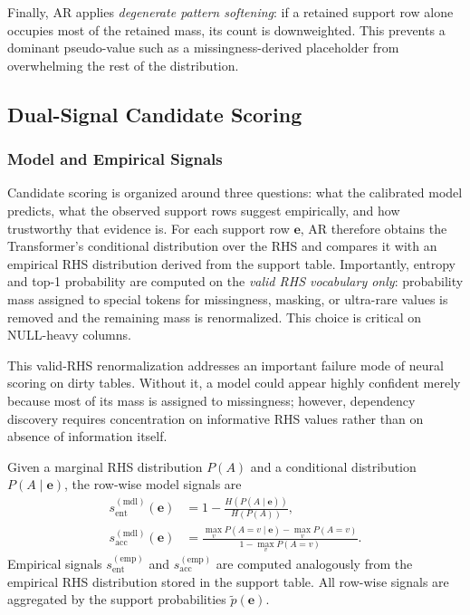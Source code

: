 \documentclass[conference]{IEEEtran}
\begin{document}
Finally, AR applies \emph{degenerate pattern softening}: if a retained support row alone occupies most of the retained mass, its count is downweighted. This prevents a dominant pseudo-value such as a missingness-derived placeholder from overwhelming the rest of the distribution.

\subsection{Dual-Signal Candidate Scoring}\label{sec:scoring}

\subsubsection{Model and Empirical Signals}

Candidate scoring is organized around three questions: what the calibrated model predicts, what the observed support rows suggest empirically, and how trustworthy that evidence is. For each support row $\mathbf{e}$, AR therefore obtains the Transformer's conditional distribution over the RHS and compares it with an empirical RHS distribution derived from the support table. Importantly, entropy and top-1 probability are computed on the \emph{valid RHS vocabulary only}: probability mass assigned to special tokens for missingness, masking, or ultra-rare values is removed and the remaining mass is renormalized. This choice is critical on NULL-heavy columns.

This valid-RHS renormalization addresses an important failure mode of neural scoring on dirty tables. Without it, a model could appear highly confident merely because most of its mass is assigned to missingness; however, dependency discovery requires concentration on informative RHS values rather than on absence of information itself.

Given a marginal RHS distribution $P(A)$ and a conditional distribution $P(A\mid \mathbf{e})$, the row-wise model signals are
\begin{align}
    s_{\mathrm{ent}}^{(\mathrm{mdl})}(\mathbf{e}) &= 1 - \frac{H(P(A\mid \mathbf{e}))}{H(P(A))}, \\
    s_{\mathrm{acc}}^{(\mathrm{mdl})}(\mathbf{e}) &= \frac{\max_v P(A{=}v\mid \mathbf{e}) - \max_v P(A{=}v)}{1-\max_v P(A{=}v)}.
\end{align}
Empirical signals $s_{\mathrm{ent}}^{(\mathrm{emp})}$ and $s_{\mathrm{acc}}^{(\mathrm{emp})}$ are computed analogously from the empirical RHS distribution stored in the support table. All row-wise signals are aggregated by the support probabilities $\tilde{p}(\mathbf{e})$.
\end{document}
